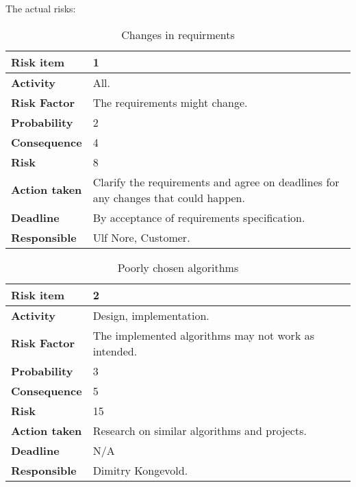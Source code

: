 The actual risks:

\begin{table}[htdp]
\caption{Changes in requirments}
\begin{center}
\begin{tabularx}{\textwidth}{| X | X |}
\hline
\textbf{Risk item} & 1 \\
\hline
\textbf{Activity} & All. \\
\hline
\textbf{Risk Factor} & The requirements might change. \\
\hline
\textbf{Probability} & 2 \\
\hline
\textbf{Consequence} & 4 \\
\hline
\textbf{Risk} & 8 \\
\hline
\textbf{Action taken} & Clarify the requirements and agree on deadlines for any changes that could happen.\\
\hline
\textbf{Deadline} & By acceptance of requirements specification. \\
\hline
\textbf{Responsible} & Ulf Nore, Customer. \\
\hline
\end{tabularx}
\end{center}
\label{risk_1}
\end{table}


\begin{table}[htdp]
\caption{Poorly chosen algorithms}
\begin{center}
\begin{tabularx}{\textwidth}{| X | X |}
\hline
\textbf{Risk item} & 2 \\
\hline
\textbf{Activity} & Design, implementation.  \\
\hline
\textbf{Risk Factor} & The implemented algorithms may not work as intended.\\
\hline
\textbf{Probability} & 3 \\
\hline
\textbf{Consequence} & 5 \\
\hline
\textbf{Risk} & 15 \\
\hline
\textbf{Action taken} & Research on similar algorithms and projects. \\
\hline
\textbf{Deadline} & N/A \\
\hline
\textbf{Responsible} & Dimitry Kongevold. \\
\hline
\end{tabularx}
\end{center}
\label{risk_2}
\end{table}

